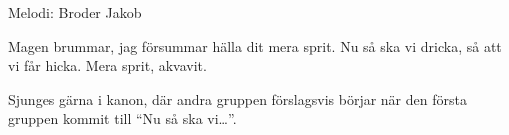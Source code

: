 \begin{song}

\begin{songmeta}
Melodi: Broder Jakob
\end{songmeta}

\begin{songtext}
Magen brummar, jag försummar
hälla dit mera sprit.
Nu så ska vi dricka, så att vi får hicka.
Mera sprit, akvavit.
\end{songtext}

\begin{songnotes}
Sjunges gärna i kanon, där andra gruppen förslagsvis börjar när den första gruppen kommit till \textquotedblleft{}Nu så ska vi\ldots\textquotedblright{}.
\end{songnotes}

\end{song}
